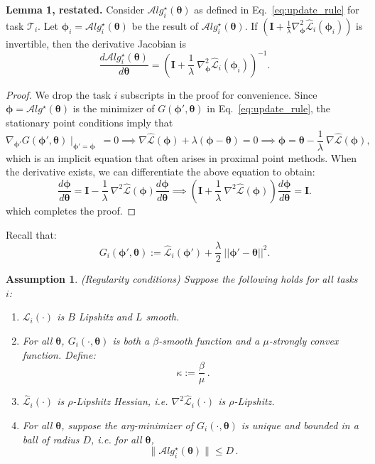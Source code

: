 \documentclass{article} \usepackage[nonatbib, final]{mod_neurips}
\newcommand{\eye}{\boldsymbol{I}}
\newcommand{\task}{\mathcal{T}}
\newtheorem{assumption}{Assumption}
\newcommand{\param}{{\bm{\phi}}}               \newcommand{\paramspace}{\Phi}
\newcommand{\prior}{{\bm{\theta}}}               \newcommand{\priorspace}{\Theta}
\newcommand{\udparam}{\param}     \newcommand{\dparam}{{\param'}}             \newcommand{\mlprior}{\prior^*_{\mathrm{ML}}}
\newcommand{\fn}{\mathcal{L}}                  \newcommand{\udfn}{\tilde{\fn}}        \newcommand{\fnht}{\hat{\fn}}        \newcommand{\ud}{\alg}
\newcommand{\algstar}{\mathcal{A}lg^\star}
\newcommand{\pgrad}{\nabla}
\begin{document}
{\bf Lemma 1, restated.}
Consider $\algstar_i(\prior)$ as defined in Eq.~\ref{eq:update_rule} for task $\task_i$. Let $\param_i = \algstar_i(\prior)$ be the result of $\algstar_i(\prior)$. If $\left( \eye + \frac{1}{\lambda} \pgrad_\param^2 \fnht_i(\param_i) \right)$ is invertible, then the derivative Jacobian is
\begin{equation*}
    \frac{d \algstar_i(\prior)}{d \prior} = \left( \eye + \frac{1}{\lambda}~ \pgrad_\param^2 \fnht_i (\param_i) \right)^{-1}.
\end{equation*}
\begin{proof}
We drop the task $i$ subscripts in the proof for convenience. Since $\param = \algstar(\prior)$ is the minimizer of $G(\dparam, \prior)$ in Eq.~\ref{eq:update_rule}, the stationary point conditions imply that
\[
\pgrad_\dparam G(\dparam, \prior) \mid_{\dparam = \udparam} \ = 0 \implies \pgrad \fnht(\udparam) + \lambda (\udparam - \prior) = 0 \implies \udparam = \prior - \frac{1}{\lambda}~\pgrad \fnht(\udparam),
\]
which is an implicit equation that often arises in proximal point methods. When the derivative exists, we can differentiate the above equation to obtain:
\[
\frac{d \udparam}{d \prior} = \eye - \frac{1}{\lambda}~\pgrad^2 \fnht(\udparam) \frac{d \udparam}{d \prior}
\implies 
\left( \eye + \frac{1}{\lambda}~\pgrad^2 \fnht(\udparam) \right) \frac{d \udparam}{d \prior} = \eye.
\]
which completes the proof.
\end{proof}

Recall that:
\[
G_i(\dparam, \prior) := \fnht_i(\dparam) + \frac{\lambda}{2}~||\dparam - \prior||^2.
\]

\begin{assumption} \label{assumption:regularity}
  (Regularity conditions)
Suppose the following holds for all tasks $i$:
\begin{enumerate}
\item $\fn_i(\cdot)$ is $B$ Lipshitz and $L$ smooth.
\item For all $\prior$, $G_i(\cdot,\prior)$ is both a $\beta$-smooth function
and a $\mu$-strongly convex function. Define:
\[
\kappa :=\frac{\beta}{\mu}  \, .
\]
\item $\fnht_i (\cdot)$ is $\rho$-Lipshitz Hessian, i.e. $\nabla^2 \fnht_i (\cdot)$ is $\rho$-Lipshitz.
\item  For all $\prior$, suppose the arg-minimizer of
  $G_i(\cdot, \prior)$ is unique and bounded in a ball of radius $D$,
  i.e. for all $\prior$,
  \[
    \|\algstar_i(\prior) \|\leq D \, .
  \]
\end{enumerate}
\end{assumption}
\end{document}
